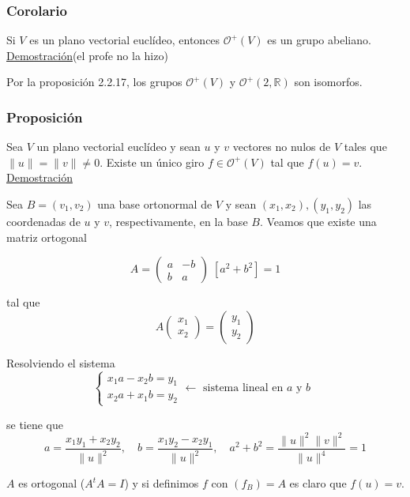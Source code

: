 \documentclass[12pt, a4paper, ones, notitlepage, openany,titlepage]{article}
\newcommand{\demostracion}{\noindent\underline{Demostración}}
\begin{document}
\subsubsection{Corolario}
Si $V$ es un plano vectorial euclídeo, entonces $\mathcal{O}^{+}(V)$ es un grupo abeliano.\\

\demostracion (el profe no la hizo)

Por la proposición 2.2.17, los grupos $\mathcal{O}^{+}(V)$ y $\mathcal{O}^{+}(2, \mathbb{R})$ son isomorfos.

\subsubsection{Proposición}
Sea $V$ un plano vectorial euclídeo y sean $u$ y $v$ vectores no nulos de $V$ tales que $\|u\|=\|v\| \neq 0$. Existe un único giro $f \in \mathcal{O}^{+}(V)$ tal que $f(u)=v$.\\

\demostracion

Sea $B=\left(v_{1}, v_{2}\right)$ una base ortonormal de $V$ y sean $\left(x_{1}, x_{2}\right),\left(y_{1}, y_{2}\right)$ las coordenadas de $u$ y $v$, respectivamente, en la base $B$. Veamos que existe una matriz ortogonal

$$
A=\left(\begin{array}{rr}
	a & -b \\
	b & a
\end{array}\right)
\; [a^2 + b^2] = 1
$$

tal que
$$
A\left(\begin{array}{l}
	x_{1} \\
	x_{2}
\end{array}\right)=\left(\begin{array}{l}
	y_{1} \\
	y_{2}
\end{array}\right)
$$

Resolviendo el sistema
$$
\begin{cases}
	x_{1} a-x_{2} b=y_{1} \\ x_{2} a+x_{1} b=y_{2}
\end{cases}
\longleftarrow \text{ sistema lineal en $a$ y $b$ }
$$

se tiene que
$$
a=\frac{x_{1} y_{1}+x_{2} y_{2}}{\|u\|^{2}}, \quad b=\frac{x_{1} y_{2}-x_{2} y_{1}}{\|u\|^{2}}, \quad a^{2}+b^{2}=\frac{\|u\|^{2}\|v\|^{2}}{\|u\|^{4}}=1
$$

$A$ es ortogonal ($A^t A = I$) y si definimos $f$ con $(f_B) = A$ es claro que $f(u)=v$.\\
\end{document}
